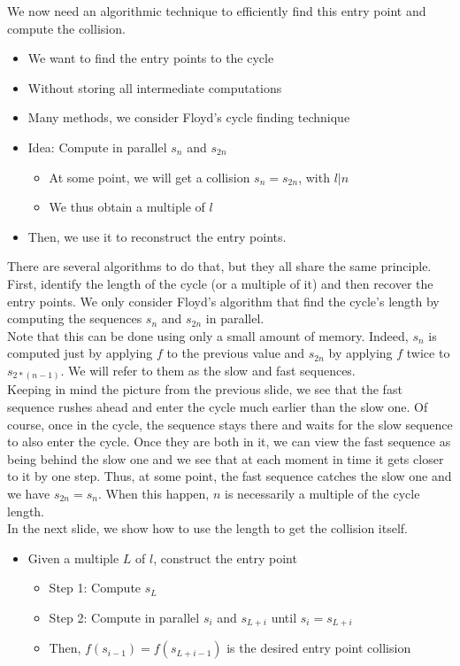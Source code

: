 		We now need an algorithmic technique to efficiently find this entry point and compute the collision.
		\begin{itemize}
			\item We want to find the entry points to the cycle
			\item Without storing all intermediate computations
			\item Many methods, we consider Floyd’s cycle finding technique\\
			\item Idea: Compute in parallel $s_n$ and $s_{2n}$
			\begin{itemize}
				\item At some point, we will get a collision $s_n = s_{2n}$, with $l|n$
				\item We thus obtain a multiple of $l$\\
			\end{itemize}
			\item Then, we use it to reconstruct the entry points.
		\end{itemize}
		There are several algorithms to do that, but they all share the same principle. 
		First, identify the length of the cycle (or a multiple of it) and then recover the entry points. 
		We only consider Floyd’s algorithm that find the cycle’s length by computing the sequences $s_n$ and $s_{2n}$ in parallel.\\
		Note that this can be done using only a small amount of memory. 
		Indeed, $s_n$ is computed just by applying $f$ to the previous value and $s_{2n}$ by applying $f$ twice to $s_{2*(n-1)}$. 
		We will refer to them as the slow and fast sequences.\\
		Keeping in mind the picture from the previous slide, we see that the fast sequence rushes ahead and enter the cycle much earlier than the slow one. 
		Of course, once in the cycle, the sequence stays there and waits for the slow sequence to also enter the cycle. 
		Once they are both in it, we can view the fast sequence as being behind the slow one and we see that at each moment in time it gets closer to it by one step. 
		Thus, at some point, the fast sequence catches the slow one and we have $s_{2n}=s_n$. 
		When this happen, $n$ is necessarily a multiple of the cycle length.\\
		In the next slide, we show how to use the length to get the collision itself.
		\begin{itemize}
			\item Given a multiple $L$ of $l$, construct the entry point
			\begin{itemize}
				\item Step 1: Compute $s_L$
				\item Step 2: Compute in parallel $s_i$ and $s_{L+i}$ until $s_i = s_{L+i}$
				\item Then, $f(s_{i-1}) = f(s_{L+i-1})$ is the desired entry point collision
			\end{itemize}
		\end{itemize}
